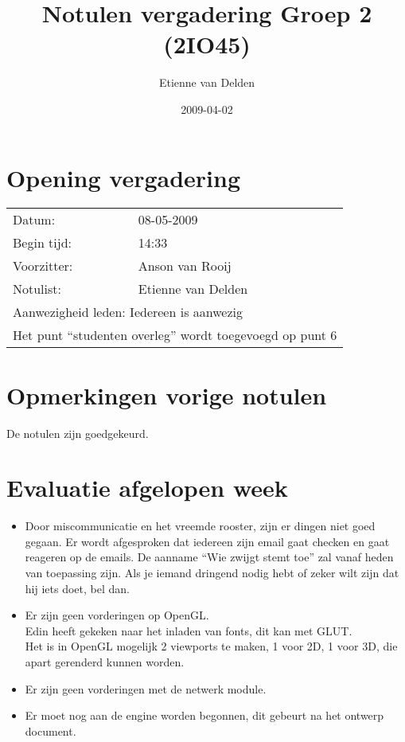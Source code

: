 \documentclass[]{article}
\title{Notulen vergadering Groep 2 (2IO45)}
\author{ Etienne van Delden }
\date{2009-04-02}
\begin{document}
\ifpdf
{}
\else
{}
\fi

\maketitle

\section{Opening vergadering} %
\label{sec:opening_vergadering}
\begin{tabular}{ll}
  Datum:      & 08-05-2009\\
  Begin tijd: & 14:33\\
  Voorzitter: & Anson van Rooij \\
  Notulist:   & Etienne van Delden\\
  \multicolumn{2}{l}{Aanwezigheid leden: Iedereen is aanwezig}\\
  \multicolumn{2}{l}{Het punt ``studenten overleg'' wordt toegevoegd op punt 6} 
\end{tabular}


\section{Opmerkingen vorige notulen} %
\label{sec:opmerkingen_vorige_notulen}
  De notulen zijn goedgekeurd.

\section{Evaluatie afgelopen week} %
\label{sec:evaluatie_afgelopen_week}
  \begin{itemize}
    \item Door miscommunicatie en het vreemde rooster, zijn er dingen niet goed gegaan. Er wordt afgesproken dat iedereen zijn email gaat checken en gaat reageren op de emails. De aanname ``Wie zwijgt stemt toe'' zal vanaf heden van toepassing zijn. Als je iemand dringend nodig hebt of zeker wilt zijn dat hij iets doet, bel dan.
    \item Er zijn geen vorderingen op OpenGL.\\
            Edin heeft gekeken naar het inladen van fonts, dit kan met GLUT. \\
            Het is in OpenGL mogelijk 2 viewports te maken, 1 voor 2D, 1 voor 3D, die apart gerenderd kunnen worden.
    \item Er zijn geen vorderingen met de netwerk module.
    \item Er moet nog aan de engine worden begonnen, dit gebeurt na het ontwerp document.
  \end{itemize}
\end{document}
